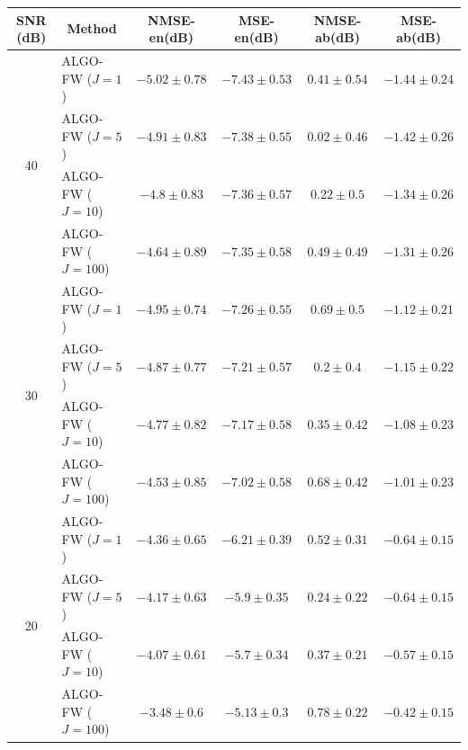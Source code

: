 \begin{table}[h]
\centering
\begin{adjustbox}{max width=\textwidth}
\begin{tabular}{|c|l|c|c|c|c|}
\hline
SNR (dB)            & \multicolumn{1}{c|}{Method}& NMSE-en(dB)         & MSE-en(dB)          & NMSE-ab(dB)         & MSE-ab(dB)          \tabularnewline \hline
\multirow{4}{*}{40} & ALGO-FW ($J=1$)            & $-5.02    \pm 0.78$ & $-7.43    \pm 0.53$ & $0.41     \pm 0.54$ & $-1.44    \pm 0.24$ \tabularnewline
                    & ALGO-FW ($J=5$)            & $-4.91    \pm 0.83$ & $-7.38    \pm 0.55$ & $0.02     \pm 0.46$ & $-1.42    \pm 0.26$ \tabularnewline
                    & ALGO-FW ($J=10$)           & $-4.8     \pm 0.83$ & $-7.36    \pm 0.57$ & $0.22     \pm 0.5$  & $-1.34    \pm 0.26$ \tabularnewline
                    & ALGO-FW ($J=100$)          & $-4.64    \pm 0.89$ & $-7.35    \pm 0.58$ & $0.49     \pm 0.49$ & $-1.31    \pm 0.26$ \tabularnewline \hline
\multirow{4}{*}{30} & ALGO-FW ($J=1$)            & $-4.95    \pm 0.74$ & $-7.26    \pm 0.55$ & $0.69     \pm 0.5$  & $-1.12    \pm 0.21$ \tabularnewline
                    & ALGO-FW ($J=5$)            & $-4.87    \pm 0.77$ & $-7.21    \pm 0.57$ & $0.2      \pm 0.4$  & $-1.15    \pm 0.22$ \tabularnewline
                    & ALGO-FW ($J=10$)           & $-4.77    \pm 0.82$ & $-7.17    \pm 0.58$ & $0.35     \pm 0.42$ & $-1.08    \pm 0.23$ \tabularnewline
                    & ALGO-FW ($J=100$)          & $-4.53    \pm 0.85$ & $-7.02    \pm 0.58$ & $0.68     \pm 0.42$ & $-1.01    \pm 0.23$ \tabularnewline \hline
\multirow{4}{*}{20} & ALGO-FW ($J=1$)            & $-4.36    \pm 0.65$ & $-6.21    \pm 0.39$ & $0.52     \pm 0.31$ & $-0.64    \pm 0.15$ \tabularnewline
                    & ALGO-FW ($J=5$)            & $-4.17    \pm 0.63$ & $-5.9     \pm 0.35$ & $0.24     \pm 0.22$ & $-0.64    \pm 0.15$ \tabularnewline
                    & ALGO-FW ($J=10$)           & $-4.07    \pm 0.61$ & $-5.7     \pm 0.34$ & $0.37     \pm 0.21$ & $-0.57    \pm 0.15$ \tabularnewline
                    & ALGO-FW ($J=100$)          & $-3.48    \pm 0.6$  & $-5.13    \pm 0.3$  & $0.78     \pm 0.22$ & $-0.42    \pm 0.15$ \tabularnewline \hline

\end{tabular}
\end{adjustbox}
\end{table}
